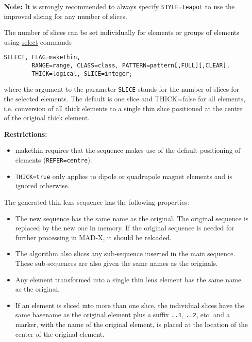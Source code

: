 \textbf{Note:} It is strongly recommended to always specify {\tt STYLE=teapot}  
to use the improved slicing for any number of slices.




The number of slices can be set individually for elements or groups of
elements using
\href{http://mad.web.cern.ch/mad/madx.old/Introduction/select.html}{select}
commands
\begin{verbatim}
SELECT, FLAG=makethin, 
        RANGE=range, CLASS=class, PATTERN=pattern[,FULL][,CLEAR],
        THICK=logical, SLICE=integer;
\end{verbatim}

where the argument to the parameter {\tt SLICE} stands for the number of
slices for the selected elements. The default is one slice and
THICK=false for all elements, i.e. conversion of all thick elements to a
single thin slice positioned at the centre of the original thick
element.

{\bf Restrictions:}
\begin{itemize}
\item makethin requires that the sequence makes use of the default
  positioning of elements ({\tt REFER=centre}). 
\item {\tt THICK=true} only applies to dipole or quadrupole magnet
  elements and is ignored otherwise.  
\end{itemize}


The generated thin lens sequence has the following properties: 
\begin{itemize}
\item The new sequence has the same name as the original. The original sequence
  is replaced by the new one in memory. If the original sequence is
  needed for further processing in MAD-X, it should be reloaded.
\item The algorithm also slices any sub-sequence inserted in the main
  sequence. These sub-sequences are also given the same names as the originals. 
\item Any element transformed into a single thin lens element has the
  same name as the original. 
\item If an element is sliced into more than one slice, the individual
  slices have the same basename as the original element plus a suffix 
  {\tt ..1}, {\tt ..2}, etc. and a marker, with the name of the original
  element, is placed at the location of the center of the original element.
\end{itemize}



